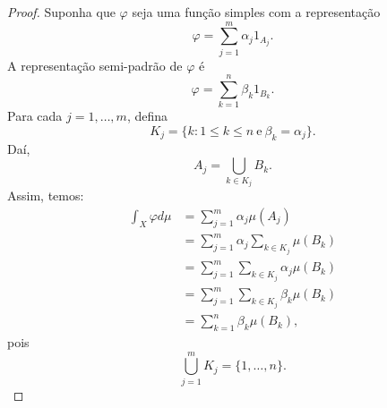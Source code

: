 \begin{proof}
    Suponha que $\varphi$ seja uma função simples com a representação 
    \[
    \varphi = \sum_{j=1}^{m} \alpha_j 1_{A_j}.
    \]
    A representação semi-padrão de $\varphi$ é
    \[
    \varphi = \sum_{k=1}^{n} \beta_k 1_{B_k}.
    \]
    Para cada $j = 1, \dots, m$, defina
    \[
    K_j = \{ k : 1 \leq k \leq n \ \text{e} \ \beta_k = \alpha_j \}.
    \]
    Daí,
    \[
    A_j = \bigcup_{k \in K_j} B_k.
    \]
    Assim, temos:
    \begin{align*}
        \int_X \varphi d\mu &= \sum_{j=1}^{m} \alpha_j \mu(A_j) \\
        &= \sum_{j=1}^{m} \alpha_j \sum_{k \in K_j} \mu(B_k) \\
        &= \sum_{j=1}^{m} \sum_{k \in K_j} \alpha_j \mu(B_k) \\
        &= \sum_{j=1}^{m} \sum_{k \in K_j} \beta_k \mu(B_k) \\
        &= \sum_{k=1}^{n} \beta_k \mu(B_k),
    \end{align*}
    pois
    \[
    \bigcup_{j=1}^{m} K_j = \{ 1, \dots, n \}.
    \]
\end{proof}
